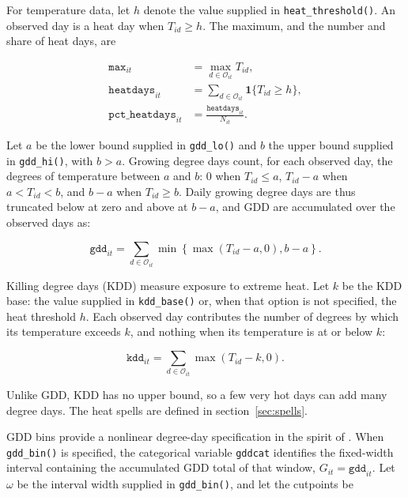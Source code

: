 For temperature data, let $h$ denote the value supplied in \texttt{heat\_threshold()}. An observed day is a heat day when $T_{id} \geq h$. The maximum, and the number and share of heat days, are

\begin{align}
	\texttt{max}_{it} & = \max_{d \in \mathcal{O}_{it}} T_{id} , \\
	\texttt{heatdays}_{it} & = \sum_{d \in \mathcal{O}_{it}} \mathbf{1}\{T_{id} \geq h\} , \\
	\texttt{pct\_heatdays}_{it} & = \frac{\texttt{heatdays}_{it}}{N_{it}} .
\end{align}

Let $a$ be the lower bound supplied in \texttt{gdd\_lo()} and $b$ the upper bound supplied in \texttt{gdd\_hi()}, with $b > a$.  Growing degree days count, for each observed day, the degrees of temperature between $a$ and $b$: 0 when $T_{id} \leq a$, $T_{id} - a$ when $a < T_{id} < b$, and $b - a$ when $T_{id} \geq b$. Daily growing degree days are thus truncated below at zero and above at $b - a$, and GDD are accumulated over the observed days as:

\begin{equation}
	\texttt{gdd}_{it} = \sum_{d \in \mathcal{O}_{it}} \min \left\{ \max \left( T_{id} - a, 0 \right), b - a \right\} .
\end{equation}

Killing degree days (KDD) measure exposure to extreme heat. Let $k$ be the KDD base: the value supplied in \texttt{kdd\_base()} or, when that option is not specified, the heat threshold $h$. Each observed day contributes the number of degrees by which its temperature exceeds $k$, and nothing when its temperature is at or below $k$:

\begin{equation}
	\texttt{kdd}_{it} = \sum_{d \in \mathcal{O}_{it}} \max \left( T_{id} - k, 0 \right) .
\end{equation}

\noindent Unlike GDD, KDD has no upper bound, so a few very hot days can add many degree days. The heat spells are defined in section~\ref{sec:spells}.

GDD bins provide a nonlinear degree-day specification in the spirit of \citet{DescheneGreenstone07}. When \texttt{gdd\_bin()} is specified, the categorical variable \texttt{gddcat} identifies the fixed-width interval containing the accumulated GDD total of that window, $G_{it} = \texttt{gdd}_{it}$. Let $\omega$ be the interval width supplied in \texttt{gdd\_bin()}, and let the cutpoints be

